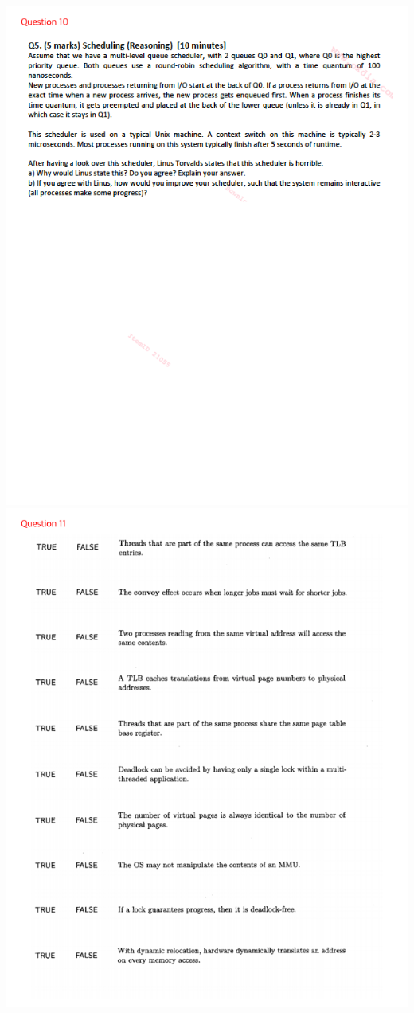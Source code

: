 \documentclass[12pt]{article}
\begin{document}
\begin{center}
    \includegraphics[width=\linewidth]{../../images/midterm_5_10.png}
    \includegraphics[width=\linewidth]{../../images/midterm_5_11.png}

\end{center}
\end{document}
